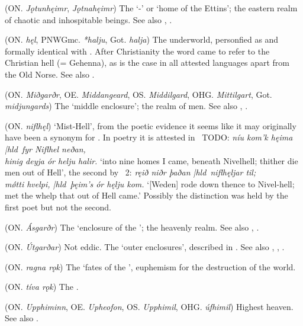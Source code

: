 \begin{itemize}

 (ON. \emph{Jǫtunhęimr}, \emph{Jǫtnahęimr})
  The ‘-’ or ‘home of the Ettins’; the eastern realm of chaotic and inhospitable beings. See also , .

 (ON. \emph{hęl}, PNWGmc. \emph{*halju}, Got. \emph{halja})
  The underworld, personfied as and formally identical with . After Christianity the word came to refer to the Christian hell (= Gehenna), as is the case in all attested languages apart from the Old Norse. See also .

 (ON. \emph{Miðgarðr}, OE. \emph{Middangeard}, OS. \emph{Middilgard}, OHG. \emph{Mittilgart}, Got. \emph{midjungards})
  The ‘middle enclosure’; the realm of men. See also , .

 (ON. \emph{niflhęl})
  ‘Mist-Hell’, from the poetic evidence it seems like it may originally have been a synonym for . In poetry it is attested in \Vafthrudnismal\ TODO: \emph{níu kom’k hęima |hld\ fyr Niflhel neðan, \\ hinig deyja ór helju halir. } ‘into nine homes I came, beneath Nivelhell; thither die men out of Hell’, the second by \Baldrsdraumar\ 2: \emph{ręið niðr þaðan |hld\ niflhęljar til; \\ mǿtti hvelpi, |hld\ þęim’s ór hęlju kom.} ‘[Weden] rode down thence to Nivel-hell; met the whelp that out of Hell came.’ Possibly the distinction was held by the first poet but not the second.

 (ON. \emph{Ásgarðr})
  The ‘enclosure of the ’; the heavenly realm. See also , .

 (ON. \emph{Útgarðar})
  Not eddic. The ‘outer enclosures’, described in \Gylfaginning. See also , , .

 (ON. \emph{ragna rǫk})
  The ‘fates of the ’, euphemism for the destruction of the world.

 (ON. \emph{tíva rǫk})
  The .

 (ON. \emph{Upphiminn}, OE. \emph{Upheofon}, OS. \emph{Upphimil}, OHG. \emph{úfhimil})
  Highest heaven. See also .

\end{itemize}
